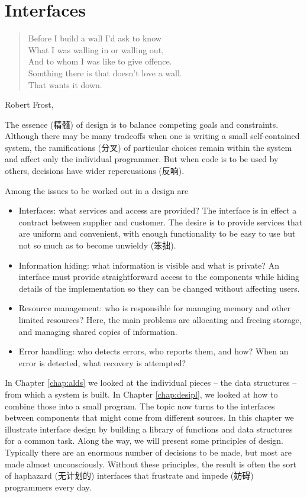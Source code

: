 \chapter{Interfaces}
\label{chap:interface}
\begin{quote}
    Before I build a wall I'd ask to know \\
    What I was walling in or walling out, \\
    And to whom I was like to give offence. \\
    Somthing there is that doesn't love a wall. \\
    That wants it down.
\end{quote}
\begin{quotesrc}
    Robert Frost, 
\end{quotesrc}

The essence (精髓) of design is to balance competing goals and constraints.
Although there may be many tradeoffs when one is writing a small
self-contained system, the ramifications (分叉) of particular choices
remain within the system and affect only the individual programmer. But
when code is to be used by others, decisions have wider repercussions
(反响).

Among the issues to be worked out in a design are
\begin{itemize}
    \item Interfaces: what services and access are provided? The interface
        is in effect a contract between supplier and customer. The desire
        is to provide services that are uniform and convenient, with enough
        functionality to be easy to use but not so much as to become
        unwieldy (笨拙).
    \item Information hiding: what information is visible and what is
        private? An interface must provide straightforward access to the
        components while hiding details of the implementation so they can
        be changed without affecting users.
    \item Resource management: who is responsible for managing memory and
        other limited resources? Here, the main problems are allocating and
        freeing storage, and managing shared copies of information.
    \item Error handling: who detects errors, who reports them, and how?
        When an error is detected, what recovery is attempted?
\end{itemize}

In Chapter \ref{chap:alds} we looked at the individual pieces -- the data
structures -- from which a system is built. In Chapter \ref{chap:desipl},
we looked at how to combine those into a small program. The topic now turns
to the interfaces between components that might come from different
sources. In this chapter we illustrate interface design by building a
library of functions and data structures for a common task. Along the way,
we will present some principles of design. Typically there are an enormous
number of decisions to be made, but most are made almost unconsciously.
Without these principles, the result is often the sort of haphazard
(无计划的) interfaces that frustrate and impede (妨碍) programmers every
day.
